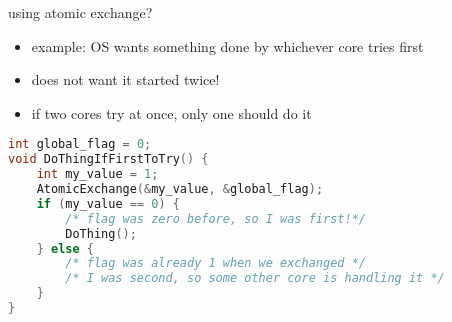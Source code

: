 \begin{frame}[fragile]{using atomic exchange?}
    \begin{itemize}
    \item example: OS wants something done by whichever core tries first
    \item does not want it started twice!
    \item if two cores try at once, only one should do it
    \end{itemize}
\begin{lstlisting}[language=C,style=smaller]
int global_flag = 0;
void DoThingIfFirstToTry() {
    int my_value = 1;
    AtomicExchange(&my_value, &global_flag);
    if (my_value == 0) {
        /* flag was zero before, so I was first!*/
        DoThing();
    } else {
        /* flag was already 1 when we exchanged */
        /* I was second, so some other core is handling it */
    }
}
\end{lstlisting}
\end{frame}

